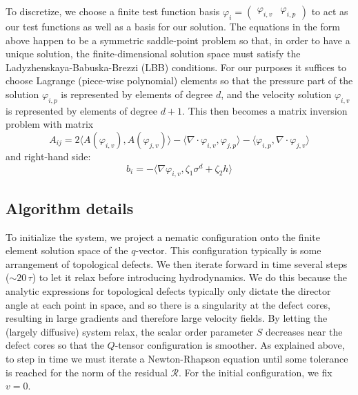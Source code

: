 \documentclass[reqno]{article}
\begin{document}
  To discretize, we choose a finite test function basis $\varphi_i
  = \begin{pmatrix} \varphi_{i, v} &\varphi_{i, p} \end{pmatrix}$ to act
  as our test functions as well as a basis for our solution.
  The equations in the form above happen to be a symmetric saddle-point problem
  so that, in order to have a unique solution, the finite-dimensional solution
  space must satisfy the Ladyzhenskaya-Babuska-Brezzi (LBB) conditions.
  For our purposes it suffices to choose Lagrange (piece-wise polynomial)
  elements so that the pressure part of the solution $\varphi_{i, p}$ is
  represented by elements of degree $d$, and the velocity solution $\varphi_{i, v}$ is
  represented by elements of degree $d + 1$.
  This then becomes a matrix inversion problem with matrix
  \begin{equation}
    A_{ij}
    =
    2 \langle A(\varphi_{i, v}), A(\varphi_{j, v}) \rangle
    - \langle \nabla \cdot \varphi_{i, v}, \varphi_{j, p} \rangle
    - \langle \varphi_{i, p}, \nabla \cdot \varphi_{j, v} \rangle
  \end{equation}
  and right-hand side:
  \begin{equation}
    b_i
    =
    - \langle \nabla \varphi_{i, v}, \zeta_1 \sigma^d + \zeta_2 h \rangle
  \end{equation}

  \subsection{Algorithm details}
  To initialize the system, we project a nematic configuration onto the finite
  element solution space of the $q$-vector.
  This configuration typically is some arrangement of topological defects.
  We then iterate forward in time several steps ($\sim 20 \, \tau$) to let it
  relax before introducing hydrodynamics.
  We do this because the analytic expressions for topological defects typically
  only dictate the director angle at each point in space, and so there is a
  singularity at the defect cores, resulting in large gradients and therefore
  large velocity fields.
  By letting the (largely diffusive) system relax, the scalar order parameter
  $S$ decreases near the defect cores so that the $Q$-tensor configuration is
  smoother.
  As explained above, to step in time we must iterate a Newton-Rhapson equation
  until some tolerance is reached for the norm of the residual $\mathcal{R}$.
  For the initial configuration, we fix $v = 0$.
\end{document}
